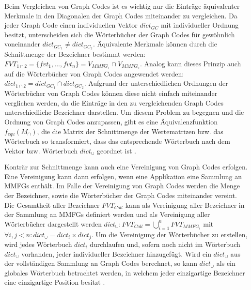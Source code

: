 Beim Vergleichen von Graph Codes ist es wichtig nur die Einträge äquivalenter Merkmale in den Diagonalen der Graph Codes miteinander zu vergleichen.
Da jeder Graph Code einen individuellen Vektor $dict_{GC}$ mit individueller Ordnung besitzt, unterscheiden sich die Wörterbücher der Graph Codes für gewöhnlich voneinander $dict_{GC_1} \neq dict_{GC_2}$.
Äquivalente Merkmale können durch die Schnittmenge der Bezeichner bestimmt werden: $FVT_{1 \cap 2} = \{fvt_1,...,fvt_n\} = V_{MMFG_1} \cap V_{MMFG_2}$.
Analog kann dieses Prinzip auch auf die Wörterbücher von Graph Codes angewendet werden: $dict_{1 \cap 2 } = dict_{GC_1} \cap dict_{GC_2}$.
Aufgrund der unterschiedlichen Ordnungen der Wörterbücher von Graph Codes können diese nicht einfach miteinander verglichen werden, da die Einträge in den zu vergleichenden Graph Codes unterschiedliche Bezeichner darstellen.
Um diesem Problem zu begegnen und die Ordnung von Graph Codes anzupassen, gibt es eine Äquivalenzfunktion $f_{equ}(M_{\cap})$, die die Matrix der Schnittmenge der Wertematrizen bzw. das Wörterbuch so transformiert, dass das entsprechende Wörterbuch nach dem Vektor bzw. Wörterbuch $dict_{\cup}$ geordnet ist \cite{gc-2d-proj-mmfg}.

Konträr zur Schnittmenge kann auch eine Vereinigung von Graph Codes erfolgen.
Eine Vereinigung kann dann erfolgen, wenn eine Applikation eine Sammlung an MMFGs enthält.
Im Falle der Vereinigung von Graph Codes werden die Menge der Bezeichner, sowie die Wörterbücher der Graph Codes miteinander vereint.
Die Gesamtheit aller Bezeichner $FVT_{Coll}$ kann als Vereinigung aller Bezeichner in der Sammlung an MMFGs definiert werden und als Vereinigung aller Wörterbücher dargestellt werden $dict_{\cup}: FVT_{Coll} = \bigcup^{n}_{i=1} FVT_{MMFG_i}$ mit $\forall i,j < n: dict_{\cup} = dict_i \times dict_j$.
Um die Vereinigung der Wörterbücher zu erstellen, wird jedes Wörterbuch $dict_i$ durchlaufen und, sofern noch nicht im Wörterbuch $dict_{\cup}$ vorhanden, jeder individueller Bezeichner hinzugefügt.
Wird ein $dict_{\cup}$ aus der vollständigen Sammlung an Graph Codes berechnet, so kann $dict_{\cup}$ als ein globales Wörterbuch betrachtet werden, in welchem jeder einzigartige Bezeichner eine einzigartige Position besitzt \cite{gc-2d-proj-mmfg}.



